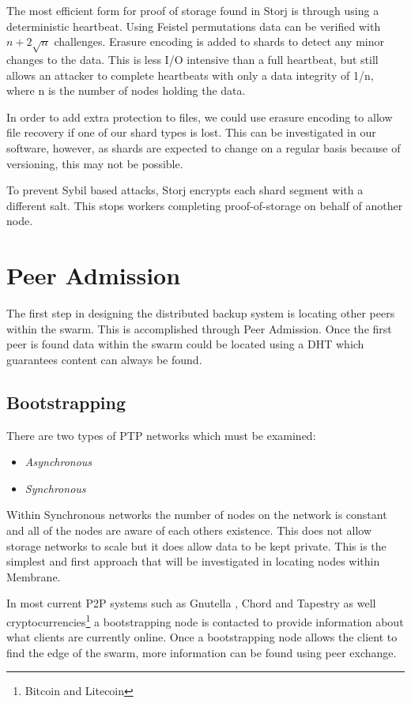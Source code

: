 \documentclass[11pt, a4paper, twocolumn, twoside]{report}
\begin{document}
The most efficient form for proof of storage found in Storj is through using a deterministic heartbeat. Using Feistel permutations data can be verified with $n + 2 \sqrt{n}$ challenges. Erasure encoding is added to shards to detect any minor changes to the data. This is less I/O intensive than a full heartbeat, but still allows an attacker to complete heartbeats with only a data integrity of 1/n, where n is the number of nodes holding the data.

In order to add extra protection to files, we could use erasure encoding to allow file recovery if one of our shard types is lost. This can be investigated in our software, however, as shards are expected to change on a regular basis because of versioning, this may not be possible.

To prevent Sybil based attacks, Storj encrypts each shard segment with a different salt. This stops workers completing proof-of-storage on behalf of another node.

\section{Peer Admission}

The first step in designing the distributed backup system is locating other peers within the swarm. This is accomplished through Peer Admission. Once the first peer is found data within the swarm could be located using a DHT which guarantees content can always be found.

\subsection{Bootstrapping}

There are two types of PTP networks which must be examined:

\begin{itemize}
 \item \emph{Asynchronous}
 \item \emph{Synchronous}
\end{itemize}

Within Synchronous networks the number of nodes on the network is constant and all of the nodes are aware of each others existence. This does not allow storage networks to scale but it does allow data to be kept private. \citep{saxena2003admission} This is the simplest and first approach that will be investigated in locating nodes within Membrane.

In most current P2P systems such as Gnutella \citep{klingberg2002gnutella}, Chord and Tapestry as well cryptocurrencies\footnote{Bitcoin and Litecoin} a bootstrapping node is contacted to provide information about what clients are currently online. Once a bootstrapping node allows the client to find the edge of the swarm, more information can be found using peer exchange.
\end{document}
